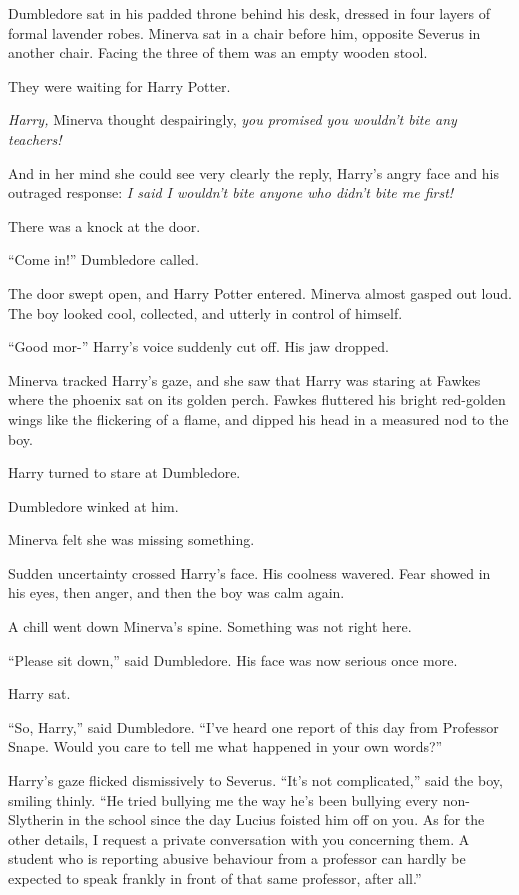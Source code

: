 Dumbledore sat in his padded throne behind his desk, dressed in four
layers of formal lavender robes. Minerva sat in a chair before him,
opposite Severus in another chair. Facing the three of them was an empty
wooden stool.

They were waiting for Harry Potter.

\emph{Harry,} Minerva thought despairingly, \emph{you promised you
wouldn't bite any teachers!}

And in her mind she could see very clearly the reply, Harry's angry face
and his outraged response: \emph{I said I wouldn't bite anyone who
didn't bite me first!}

There was a knock at the door.

``Come in!'' Dumbledore called.

The door swept open, and Harry Potter entered. Minerva almost gasped out
loud. The boy looked cool, collected, and utterly in control of himself.

``Good mor-'' Harry's voice suddenly cut off. His jaw dropped.

Minerva tracked Harry's gaze, and she saw that Harry was staring at
Fawkes where the phoenix sat on its golden perch. Fawkes fluttered his
bright red-golden wings like the flickering of a flame, and dipped his
head in a measured nod to the boy.

Harry turned to stare at Dumbledore.

Dumbledore winked at him.

Minerva felt she was missing something.

Sudden uncertainty crossed Harry's face. His coolness wavered. Fear
showed in his eyes, then anger, and then the boy was calm again.

A chill went down Minerva's spine. Something was not right here.

``Please sit down,'' said Dumbledore. His face was now serious once
more.

Harry sat.

``So, Harry,'' said Dumbledore. ``I've heard one report of this day from
Professor Snape. Would you care to tell me what happened in your own
words?''

Harry's gaze flicked dismissively to Severus. ``It's not complicated,''
said the boy, smiling thinly. ``He tried bullying me the way he's been
bullying every non-Slytherin in the school since the day Lucius foisted
him off on you. As for the other details, I request a private
conversation with you concerning them. A student who is reporting
abusive behaviour from a professor can hardly be expected to speak
frankly in front of that same professor, after all.''

